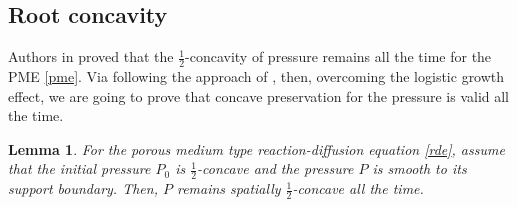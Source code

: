 \documentclass[10pt]{article}         %
\newtheorem{lemma}{Lemma}[section]
\numberwithin{equation}{section}
\begin{document}
\subsection{Root concavity}
 Authors in \cite{DHL2001} proved that the $\frac{1}{2}$-concavity of pressure remains all the time for the PME \eqref{pme}. Via following the approach of \cite{DHL2001}, then, overcoming the logistic growth effect, we are going to prove that concave  preservation for the pressure  is valid all the time. 
\begin{lemma}\label{12concave}
For the porous medium type reaction-diffusion equation \eqref{rde}, assume that the initial pressure $P_0$ is $\frac{1}{2}$-concave  and the pressure $P$ is smooth to its support boundary. Then, $P$ remains spatially $\frac{1}{2}$-concave all the time. 
\end{lemma}
\end{document}
